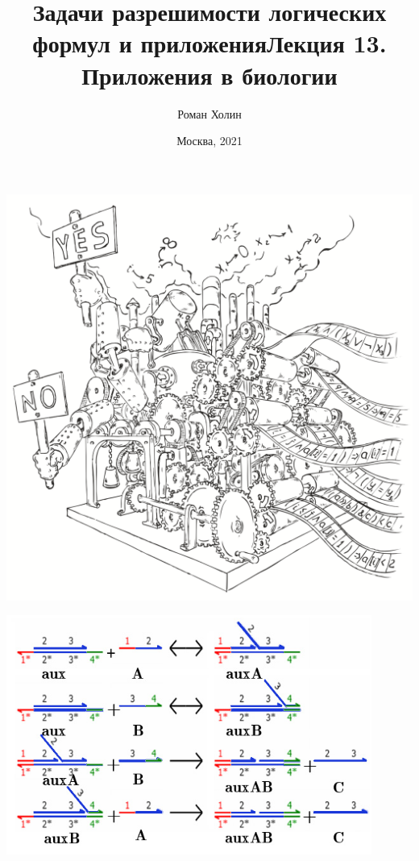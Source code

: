\documentclass{beamer}
\begin{document}
\title{Задачи разрешимости логических формул и приложения\newline Лекция 13. Приложения в биологии}
\author{Роман Холин}
\date{Москва, 2021}

\begin{frame}
\includegraphics[scale=0.5]{../decision-procedure.png}
\end{frame}

\frame{\titlepage}

\begin{frame}
\includegraphics[scale=0.5]{gen1.png}
\end{frame}
\end{document}
